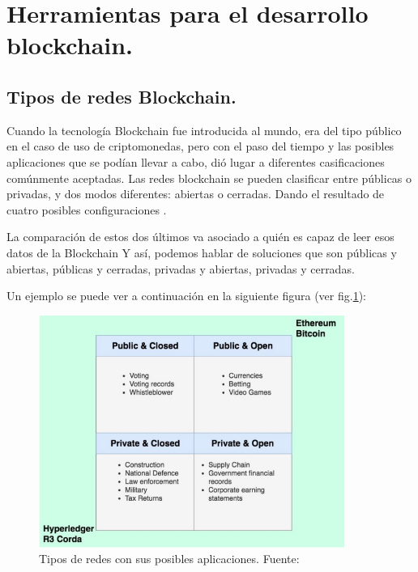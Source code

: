 \section{Herramientas para el desarrollo blockchain.}

\subsection{Tipos de redes Blockchain.}

Cuando la tecnología Blockchain fue introducida al mundo, era del tipo público en el caso de uso de criptomonedas, pero
con el paso del tiempo y las posibles aplicaciones que se podían llevar a cabo, dió lugar a diferentes casificaciones 
comúnmente aceptadas. Las redes blockchain se pueden clasificar entre públicas o privadas, y dos modos diferentes: 
abiertas o cerradas. Dando el resultado de cuatro posibles configuraciones \cite{public-private-blockchain}.

\vspace{5mm}

\noindent La comparación de estos dos últimos va asociado a quién es capaz de leer esos datos de la Blockchain Y así, 
podemos hablar de soluciones que son públicas y abiertas, públicas y cerradas, privadas y abiertas, privadas y 
cerradas.

\vspace{5mm}

\noindent Un ejemplo se puede ver a continuación en la siguiente figura (ver fig.\ref{fig:tipos-de-redes}):

\vspace{5mm}

\begin{figure}[ht!]
    \centering
    \includegraphics[width=10cm]{imagenes/herramientas/tipos_de_redes}
    \caption{Tipos de redes con sus posibles aplicaciones. Fuente: \cite{public-private-blockchain}}
    \label{fig:tipos-de-redes}
\end{figure}


